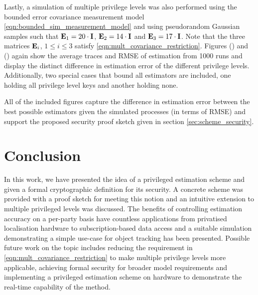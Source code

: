 \documentclass[letterpaper, 10 pt, conference]{IEEEtran}
\theoremstyle{definition}
\begin{document}

Lastly, a simulation of multiple privilege levels was also performed using the bounded error covariance measurement model \eqref{eqn:bounded_sim_measurement_model} and using pseudorandom Gaussian samples such that ${{\mathbf{E}}}_1=20 \cdot {\ensuremath{{\mathbf{I}}}}$, ${{\mathbf{E}}}_2=14 \cdot {\ensuremath{{\mathbf{I}}}}$ and ${{\mathbf{E}}}_3=17 \cdot {\ensuremath{{\mathbf{I}}}}$. Note that the three matrices ${{\mathbf{E}}}_i$, $1 \leq i \leq 3$ satisfy \eqref{eqn:mult_covariance_restriction}. Figures () and () again show the average traces and RMSE of estimation from 1000 runs and display the distinct difference in estimation error of the different privilege levels. Additionally, two special cases that bound all estimators are included, one holding all privilege level keys and another holding none.


All of the included figures capture the difference in estimation error between the best possible estimators given the simulated processes (in terms of RMSE) and support the proposed security proof sketch given in section \ref{sec:scheme_security}.

% 
%                                               
%                                               
%                                               
% 

\section{Conclusion}\label{sec:conclusion}
In this work, we have presented the idea of a privileged estimation scheme and given a formal cryptographic definition for its security. A concrete scheme was provided with a proof sketch for meeting this notion and an intuitive extension to multiple privileged levels was discussed. The benefits of controlling estimation accuracy on a per-party basis have countless applications from privatised localisation hardware to subscription-based data access and a suitable simulation demonstrating a simple use-case for object tracking has been presented. Possible future work on the topic includes reducing the requirement in \eqref{eqn:mult_covariance_restriction} to make multiple privilege levels more applicable, achieving formal security for broader model requirements and implementing a privileged estimation scheme on hardware to demonstrate the real-time capability of the method.






\end{document}
